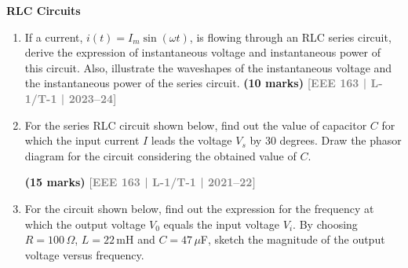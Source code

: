 \documentclass[12pt,a3paper]{article}
\newcommand{\yr}[1]{\hfill\textcolor{gray}{\small\textbf{[#1]}}}
\newcommand{\mk}[1]{\textcolor{orange!70!black}{\small\textbf{(#1 marks)}}}
\newcommand{\subtopic}[2]{%
  \vspace{10pt}
  \noindent\begin{tcolorbox}[colback=#1!8,colframe=#1,boxrule=0.6pt,arc=4pt,
    left=6pt,right=6pt,top=4pt,bottom=4pt]
    \small\bfseries\textcolor{#1}{#2}
  \end{tcolorbox}
  \vspace{2pt}
}
\begin{document}
\subtopic{cB}{RLC Circuits}
\label{sub:s2-rlc}

\begin{enumerate}\item If a current, $i(t) = I_m \sin(\omega t)$, is flowing through an RLC series circuit, derive the expression of instantaneous voltage and instantaneous power of this circuit. Also, illustrate the waveshapes of the instantaneous voltage and the instantaneous power of the series circuit.
\mk{10} \yr{EEE 163 | L-1/T-1 | 2023--24}

\item For the series RLC circuit shown below, find out the value of capacitor $C$ for which the input current $I$ leads the voltage $V_s$ by 30 degrees. Draw the phasor diagram for the circuit considering the obtained value of $C$.
\begin{center}

\end{center}
\mk{15} \yr{EEE 163 | L-1/T-1 | 2021--22}

\item For the circuit shown below, find out the expression for the frequency at which the output voltage $V_0$ equals the input voltage $V_i$. By choosing $R = 100\,\Omega$, $L = 22$\,mH and $C = 47\,\mu$F, sketch the magnitude of the output voltage versus frequency.
\begin{center}
\end{center}
\end{enumerate}
\end{document}
